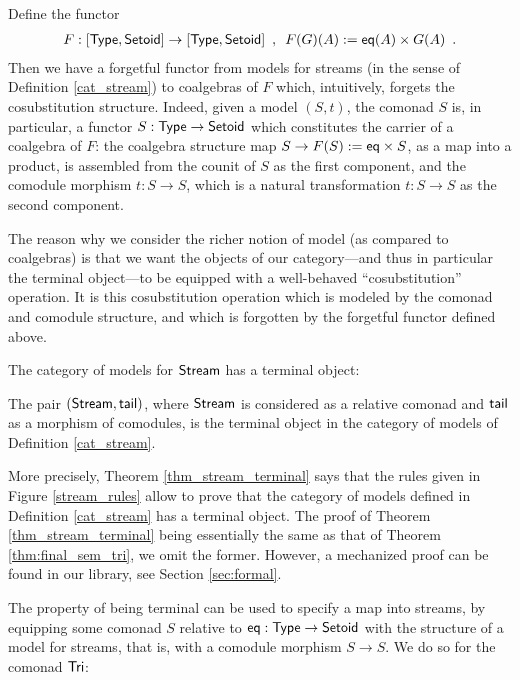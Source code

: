 \documentclass[a4paper,USenglish]{lipics}
\begin{document}
\begin{rem}\label{rem:coalg_stream}
 Define the functor
  \begin{align*}  F: [\mathsf{Type},\mathsf{Setoid}] \to [\mathsf{Type},\mathsf{Setoid}]  \enspace , \enspace
                      F(G)(A) := \mathsf{eq}(A) \times G(A) \enspace .
  \end{align*}
  Then we have a forgetful functor from models for streams (in the sense of Definition \ref{cat_stream}) to coalgebras of $F$ which, intuitively, forgets the cosubstitution structure.
  Indeed, given a model $(S,t)$, the comonad $S$ is, in particular, a functor $S:\mathsf{Type}\to\mathsf{Setoid}$ which constitutes the carrier of 
  a coalgebra of $F$: the coalgebra structure map $S \to F(S):=\mathsf{eq}\times S$, as a map into a product, 
  is assembled from the counit of $S$ as the first component, and the comodule morphism $t:S\to S$, which
  is a natural transformation $t : S \to S$ as the second component.
\end{rem}
  
  The reason why we consider the richer notion of model (as compared to coalgebras) is that we want the objects of 
  our category---and thus in particular the terminal object---to be equipped with a well-behaved \enquote{cosubstitution} operation.
  It is this cosubstitution operation which is modeled by the comonad and comodule structure, and which is forgotten by 
  the forgetful functor defined above.

  
  The category of models for $\mathsf{Stream}$ has a terminal object:
  
\begin{theorem}\label{thm_stream_terminal}
 The pair $(\mathsf{Stream}, \mathsf{tail})$, where $\mathsf{Stream}$ is considered as a relative comonad and $\mathsf{tail}$ as
 a morphism of comodules, is the terminal object in the category of models of Definition \ref{cat_stream}.
\end{theorem}

More precisely, Theorem \ref{thm_stream_terminal} says that the rules given in Figure \ref{stream_rules} allow to prove that
the category of models defined in Definition \ref{cat_stream} has a terminal object.
The proof of Theorem \ref{thm_stream_terminal} being essentially the same as that of Theorem \ref{thm:final_sem_tri}, we omit the former.
However, a mechanized proof can be found in our \coq library, see Section \ref{sec:formal}.


The property of being terminal can be used to specify a map into streams, by equipping some comonad $S$ relative to $\mathsf{eq}:\mathsf{Type}\to\mathsf{Setoid}$
with the structure of a model for streams, that is, with a comodule morphism $S\to S$.
We do so for the comonad $\mathsf{Tri}$:
\end{document}
